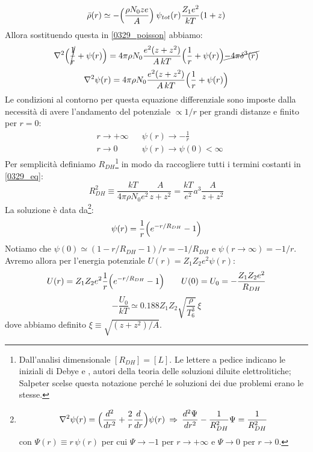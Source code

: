 \begin{equation}\label{0329_rho}
    \bar{\rho} (r) \simeq - \Bigl ( \frac{\rho N_0ze}{A} \Bigr )\: \psi_{tot}(r) \frac{Z_1e^2}{kT} (1+z)
\end{equation}
Allora sostituendo questa in \eqref{0329_poisson} abbiamo:
$$\nabla^2 \Bigl ( \cancel{\frac{1}{r}} + \psi(r) \Bigr ) = 4\pi \rho N_0 \frac{e^2(z+z^2)}{A\, kT}  \Bigl ( \frac{1}{r} +\psi(r) \Bigr ) \cancel{-4\pi \delta^3(r)}$$
\begin{equation}\label{0329_eq}
    \nabla^2 \psi(r) = 4\pi \rho N_0 \frac{e^2(z+z^2)}{A\, kT}  \Bigl ( \frac{1}{r} +\psi(r) \Bigr )
\end{equation}
Le condizioni al contorno per questa equazione differenziale sono imposte dalla necessità di avere l'andamento del potenziale $\propto 1/r$ per grandi distanze e finito per $r=0$:
\begin{displaymath}
\begin{aligned}
&r\to +\infty & &\psi(r) \to -\frac{1}{r}\\
&r\to 0 & &\psi(r) \to \psi(0)<\infty
\end{aligned}
\end{displaymath}
Per semplicità definiamo $R_{DH}$\footnote{Dall'analisi dimensionale $[R_{DH}] = [L]$. Le lettere a pedice indicano le iniziali di Debye e \Huckel{}, autori della teoria delle soluzioni diluite elettrolitiche; Salpeter scelse questa notazione perché le soluzioni dei due problemi erano le stesse.} in modo da raccogliere tutti i termini costanti in \eqref{0329_eq}:
$$R_{DH}^2 \equiv \frac{kT}{4\pi \rho N_0e^2} \frac{A}{z+z^2} = \frac{kT}{e^2} a^3 \frac{A}{z+z^2}$$
La soluzione è data da\footnote{$$\nabla^2 \psi(r) = \Bigl ( \frac{d^2}{dr^2} + \frac{2}{r}\frac{d}{dr} \Bigr )\psi(r)\: \Rightarrow\: \frac{d^2\Psi}{dr^2} - \frac{1}{R_{DH}^2}\Psi = \frac{1}{R_{DH}^2} $$%
con $\Psi (r) \equiv r\,\psi(r)$ per cui $\Psi \to -1$ per $r\to+\infty$ e $\Psi \to 0$ per $r\to 0$.}:
$$\psi(r) = \frac{1}{r}\Bigl ( e^{-r/R_{DH}}-1 \Bigr )$$
Notiamo che $\psi(0)\simeq (1-r/R_{DH}-1)/r=-1/R_{DH}$ e $\psi(r\to\infty)=-1/r$. Avremo allora per l'energia potenziale $U(r) = Z_1Z_2 e^2 \psi(r)$:
$$U(r) = Z_1Z_2 e^2 \frac{1}{r} \Bigl ( e^{-r/R_{DH}}-1 \Bigr ) \qquad U(0)=U_0 = -\frac{Z_1Z_2 e^2}{R_{DH}}$$
\begin{equation}\label{0329_U0}
-\frac{U_0}{kT}\simeq 0.188 Z_1Z_2 \sqrt{\frac{\rho}{T_6^3}}\,\xi
\end{equation}
dove abbiamo definito $\xi\equiv \sqrt{(z+z^2)/A}$.

